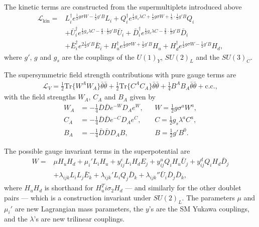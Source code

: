 \documentclass[twoside,english]{uiofysmaster}
\begin{document}
{The kinetic terms are constructed from the supermultiplets introduced above
\begin{align}
\mathcal{L}_{\text{kin}} =& L_i^{\dagger} e^{\frac{1}{2}g \sigma W - \frac{1}{2}g'B} L_i + Q_i^{\dagger} e^{\frac{1}{2}g_s \lambda C+ \frac{1}{2} g \sigma W + \frac{1}{3} \cdot \frac{1}{2} g' B} Q_i \nonumber \\
&+ \bar{U}_i^{\dagger} e^{\frac{1}{2}g_s \lambda C - \frac{4}{3} \cdot \frac{1}{2} g' B} \bar{U}_i + \bar{D}_i^{\dagger} e^{\frac{1}{2}g_s \lambda C - \frac{2}{3} \cdot \frac{1}{2} g' B} \bar{D}_i \nonumber \\
&+ \bar{E}_i^{\dagger} e^{2 \frac{1}{2}g'B} \bar{E}_i + H_u^{\dagger} e^{\frac{1}{2} g \sigma W + \frac{1}{2} g'B} H_u + H_d^{\dagger} e^{\frac{1}{2} g \sigma W - \frac{1}{2} g'B} H_d,
\end{align}
where $g'$, $g$ and $g_s$ are the couplings of the $U(1)_Y$, $SU(2)_L$ and the $SU(3)_C$. 

The supersymmetric field strength contributions with pure gauge terms are
\begin{align}
\mathcal{L}_V = \frac{1}{2} \text{Tr} \big \{ W^AW_A \big \} \bar{\theta} \bar{\theta} + \frac{1}{2} \text{Tr} \big \{ C^AC_A \big \} \bar{\theta} \bar{\theta} + \frac{1}{4} B^AB_A \bar{\theta} \bar{\theta} + \text{c.c.},
\end{align}
with the field strengths $W_A$, $C_A$ and $B_A$ given by
\begin{align}
W_A &= - \frac{1}{4} \bar{D} \bar{D} e^{-W}D_A e^W, &&W = \frac{1}{2} g \sigma^a W^a,\\
C_A &= - \frac{1}{4} \bar{D} \bar{D} e^{-C} D_A e^C, &&C = \frac{1}{2} g_s\lambda^a C^a,\\
B_A &= - \frac{1}{4} \bar{D} \bar{D} D_A B, &&B = \frac{1}{2}g'B^0.
\end{align}

The possible gauge invariant terms in the superpotential are
\begin{align}
W =& \mu H_u H_d + \mu_i' L_i H_u + y_{ij}^e L_i H_d E_j + y_{ij}^u Q_i H_u \bar{U}_j + y_{ij}^d Q_i H_d \bar{D}_j \nonumber \\
&+ \lambda_{ijk} L_i L_j\bar{E}_k + \lambda_{ijk}' L_i Q_j \bar{D}_k + \lambda_{ijk}'' \bar{U}_i \bar{D}_j \bar{D}_k,
\end{align}
where $H_uH_d$ is shorthand for $H_u^T i \sigma_2 H_d$ --- and similarly for the other doublet pairs --- which is a construction invariant under $SU(2)_L$. The parameters $\mu$ and $\mu_i'$ are new Lagrangian mass parameters, the $y$'s are the SM Yukawa couplings, and the $\lambda$'s are new trilinear couplings.
 

}
\end{document}
